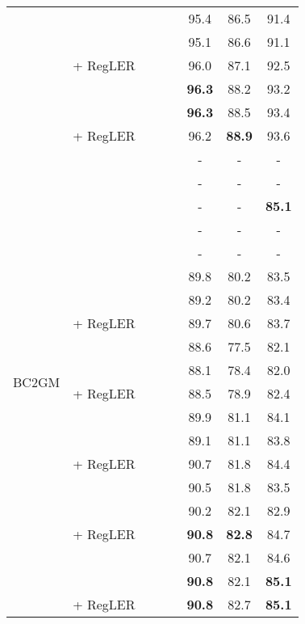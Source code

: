 \documentclass[11pt]{article}
\newcommand{\cmark}{\ding{51}}\newcommand{\xmark}{\ding{55}}\newcommand{\cross}{\ding{61}}\newcommand{\mb}[1]{\textcolor{red}{#1}}
\begin{document}
\begin{table*}[t]
\begin{adjustbox}{width=0.75\textwidth}
\begin{tabular}{ l l c c c c c c }
\cmidrule{2-8}
&  & \xmark & \xmark & \xmark & 95.4 & 86.5 & 91.4 \\
&  & \xmark & \xmark & \xmark & 95.1 & 86.6 & 91.1 \\
&  + RegLER & \cmark & \cmark & \cmark & 96.0 & 87.1 & 92.5 \\
\cmidrule{2-8}
&  & \xmark & \xmark & \xmark & \textbf{96.3} & 88.2 & 93.2 \\
&  & \xmark & \xmark & \xmark & \textbf{96.3} & 88.5 & 93.4 \\
&  + RegLER & \cmark & \cmark & \cmark & 96.2 & \textbf{88.9} & 93.6 \\
\midrule
\multirow{21}{*}{BC2GM}
&  & \xmark & \xmark & \xmark & - & - & - \\
&  & \xmark & \xmark & \xmark & - & - & -  \\
&  & \xmark & \xmark & \xmark & - & - & \textbf{85.1}  \\
&  & \xmark & \xmark & \xmark & - & - & -  \\
&  & \xmark & \xmark & \xmark & - & - & - \\
\cmidrule{2-8}
&  & \xmark & \xmark & \xmark & 89.8 & 80.2 & 83.5 \\
&  & \xmark & \xmark & \xmark & 89.2 & 80.2 &  83.4 \\
&  + RegLER & \cmark & \cmark & \cmark & 89.7 & 80.6 & 83.7 \\
\cmidrule{2-8}
&  & \xmark & \xmark & \xmark & 88.6 & 77.5 & 82.1 \\
&  & \xmark & \xmark & \xmark & 88.1 & 78.4 & 82.0 \\
&  + RegLER & \cmark & \cmark & \cmark & 88.5 & 78.9 & 82.4 \\
\cmidrule{2-8}
&  & \xmark & \xmark & \xmark & 89.9 & 81.1 & 84.1 \\
&  & \xmark & \xmark & \xmark & 89.1 & 81.1 & 83.8 \\
&  + RegLER & \cmark & \cmark & \cmark & 90.7 & 81.8 & 84.4 \\
\cmidrule{2-8}
&  & \xmark & \xmark & \xmark & 90.5 & 81.8 & 83.5 \\
&  & \xmark & \xmark & \xmark & 90.2 & 82.1 & 82.9 \\
&  + RegLER & \cmark & \cmark & \cmark & \textbf{90.8} & \textbf{82.8} & 84.7 \\
\cmidrule{2-8}
&  & \xmark & \xmark & \xmark & 90.7 & 82.1 & 84.6 \\
&  & \xmark & \xmark & \xmark & \textbf{90.8} & 82.1 & \textbf{85.1} \\
&  + RegLER & \cmark & \cmark & \cmark & \textbf{90.8} & 82.7 & \textbf{85.1} \\

\end{tabular}
\end{adjustbox}
\end{table*}
\end{document}
